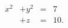 \documentclass{article}
\begin{document}
\vspace*{\fill} \vspace*{-5ex}
$$
\begin{array}{clcl}
x^2&+y^2 & = &7\\
   &+z   & = &10.\\
\end{array}
$$

\vspace*{\fill}
\end{document}

